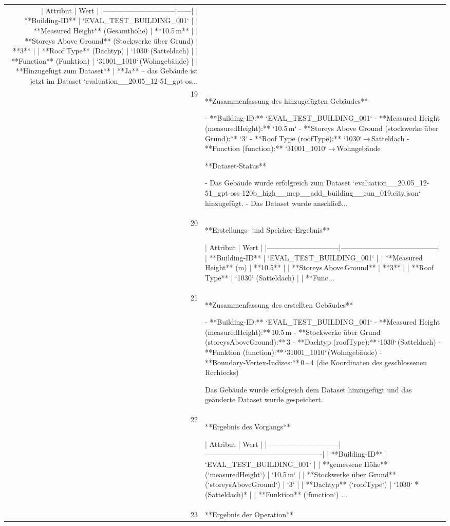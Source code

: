\documentclass[a4paper,11pt]{article}
\begin{document}
\begin{table}[ht]
\begin{tabular}{r p{12cm}}
| Attribut                     | Wert |
|------------------------------|------|
| **Building‑ID**              | `EVAL\_TEST\_BUILDING\_001` |
| **Measured Height** (Gesamthöhe) | **10.5 m** |
| **Storeys Above Ground** (Stockwerke über Grund) | **3** |
| **Roof Type** (Dachtyp)      | `1030` (Satteldach) |
| **Function** (Funktion)     | `31001\_1010` (Wohngebäude) |
| **Hinzugefügt zum Dataset** | **Ja** – das Gebäude ist jetzt im Dataset `evaluation\_\_20.05\_12-51\_gpt-os... \\
19 & **Zusammenfassung des hinzugefügten Gebäudes**

- **Building-ID:** `EVAL\_TEST\_BUILDING\_001`  
- **Measured Height (measuredHeight):** `10.5 m`  
- **Storeys Above Ground (stockwerke über Grund):** `3`  
- **Roof Type (roofType):** `1030` → Satteldach  
- **Function (function):** `31001\_1010` → Wohngebäude  

**Dataset‑Status**

- Das Gebäude wurde erfolgreich zum Dataset `evaluation\_\_20.05\_12-51\_gpt-oss-120b\_high\_\_mcp\_\_add\_building\_\_run\_019.city.json` hinzugefügt.  
- Das Dataset wurde anschließ... \\
20 & **Erstellungs‑ und Speicher‑Ergebnis**

| Attribut                     | Wert                                    |
|------------------------------|-----------------------------------------|
| **Building‑ID**              | `EVAL\_TEST\_BUILDING\_001`                |
| **Measured Height** (m)      | **10.5**                                 |
| **Storeys Above Ground**     | **3**                                    |
| **Roof Type**                | `1030` (Satteldach)                     |
| **Func... \\
21 & **Zusammenfassung des erstellten Gebäudes**

- **Building‑ID:** `EVAL\_TEST\_BUILDING\_001`  
- **Measured Height (measuredHeight):** 10.5 m  
- **Stockwerke über Grund (storeysAboveGround):** 3  
- **Dachtyp (roofType):** `1030` (Satteldach)  
- **Funktion (function):** `31001\_1010` (Wohngebäude)  
- **Boundary‑Vertex‑Indizes:** 0 – 4 (die Koordinaten des geschlossenen Rechtecks)  

Das Gebäude wurde erfolgreich dem Dataset hinzugefügt und das geänderte Dataset wurde gespeichert. \\
22 & **Ergebnis des Vorgangs**

| Attribut                     | Wert                                            |
|------------------------------|-------------------------------------------------|
| **Building‑ID**              | `EVAL\_TEST\_BUILDING\_001`                        |
| **gemessene Höhe** (`measuredHeight`) | `10.5 m` |
| **Stockwerke über Grund** (`storeysAboveGround`) | `3` |
| **Dachtyp** (`roofType`)     | `1030` *(Satteldach)*                           |
| **Funktion** (`function`)  ... \\
23 & **Ergebnis der Operation**


\end{tabular}
\end{table}
\end{document}
